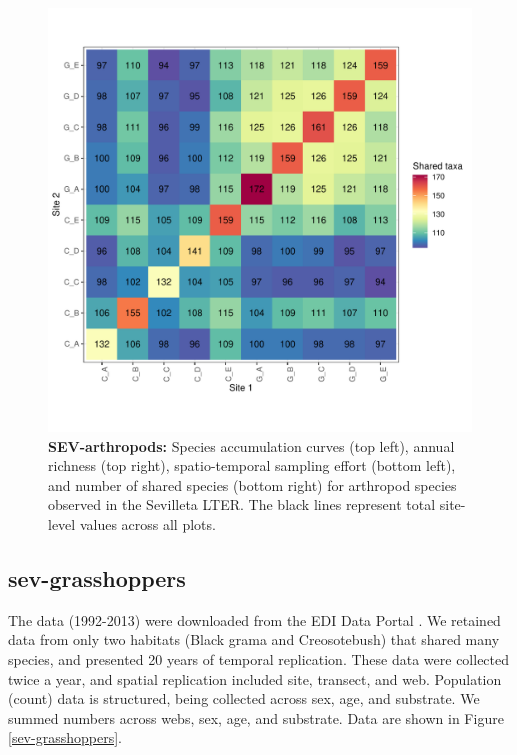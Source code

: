 \documentclass[11pt, oneside]{article}
\begin{document}
\begin{figure}[h!]
\includegraphics[scale = 0.4]{sev-arthropods-compagnoni_spp_shared.pdf}
\caption{{\bf SEV-arthropods:} Species accumulation curves (top left),  annual richness (top right), spatio-temporal sampling effort (bottom left), and number of shared species (bottom right) for arthropod species observed in the Sevilleta LTER. The black lines represent total site-level values across all plots.}
\label{sev-arthropods}
\end{figure}


\subsection {sev-grasshoppers}
The data (1992-2013) were downloaded from the EDI Data Portal \citep{sev-grasshopper}.
We retained data from only two habitats (Black grama and Creosotebush) that shared many species, and presented 20 years of temporal replication. 
These data were collected twice a year, and spatial replication included site, transect, and web. 
Population (count) data is structured, being collected across sex, age, and substrate. 
We summed numbers across webs, sex, age, and substrate.
Data are shown in Figure \ref{sev-grasshoppers}.
  
\end{document}
